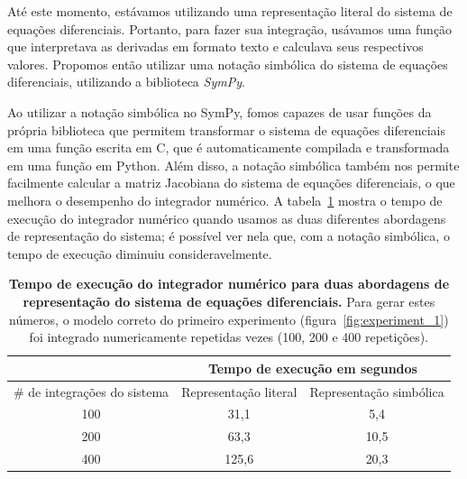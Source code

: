 \documentclass[12pt]{article}
\newcommand{\toolname}[1]{\textit{#1}}
\begin{document}
Até este momento, estávamos utilizando uma representação literal do sistema
de equações diferenciais. Portanto, para fazer sua integração, usávamos
uma função que interpretava as derivadas em formato texto e calculava 
seus respectivos valores. Propomos então utilizar uma notação simbólica 
do sistema de equações diferenciais, utilizando a biblioteca 
\toolname{SymPy}. 

Ao utilizar a notação simbólica no SymPy, fomos capazes de usar funções
da própria biblioteca que permitem transformar o sistema de equações
diferenciais em uma função escrita em C, que é automaticamente compilada
e transformada em uma função em Python. Além disso, a notação simbólica
também nos permite facilmente calcular a matriz Jacobiana do sistema de
equações diferenciais, o que melhora o desempenho do integrador
numérico. A tabela~\ref{tab:integrador} mostra o tempo de execução do
integrador numérico quando usamos as duas diferentes abordagens de
representação do sistema; é possível ver nela que, com a notação simbólica,
o tempo de execução diminuiu consideravelmente.

\begin{table}[]
\centering
\begin{tabular}{ccc}
\hline
\multicolumn{1}{l}{}  & \multicolumn{2}{c}{Tempo de execução em segundos} \\ 
\hline

\multicolumn{1}{l}{\# de integrações do sistema}
    & Representação literal  & Representação simbólica  \\
\hline
100 & 31,1  & 5,4  \\
200 & 63,3  & 10,5 \\
400 & 125,6 & 20,3 \\ 
\hline
\end{tabular}
\caption{{\bf Tempo de execução do integrador numérico para duas
    abordagens de representação do sistema de equações diferenciais.}
    Para gerar estes números, o modelo correto do primeiro experimento (figura~\ref{fig:experiment_1}) foi integrado numericamente repetidas vezes (100, 200 e 400 repetições).}
\label{tab:integrador}
\end{table}
\end{document}
